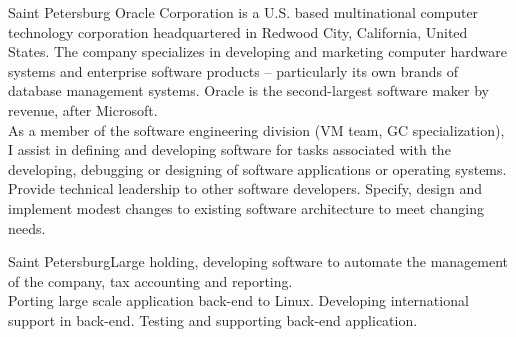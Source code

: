\documentclass[10pt,a4paper]{moderncv}
\begin{document}
    {Saint Petersburg}{
                    Oracle Corporation is a U.S. based multinational computer technology corporation headquartered in Redwood City, California, United States. 
                    The company specializes in developing and marketing computer hardware systems and enterprise software products – 
                    particularly its own brands of database management systems. Oracle is the second-largest software maker by revenue, after Microsoft.
                }{\\
	      As a member of the software engineering division (VM team, GC specialization), I assist in defining and developing software for tasks associated with the developing, debugging or designing of software applications or operating systems. Provide technical leadership to other software developers. Specify, design and implement modest changes to existing software architecture to meet changing needs.
	    \newline{}
    }
        
    {Saint Petersburg}{Large holding, developing software to automate the management of the company, tax accounting and reporting.}{\\
                Porting large scale application back-end to Linux. Developing international support in back-end. Testing and supporting back-end application.
            \newline{}
    }
\end{document}
